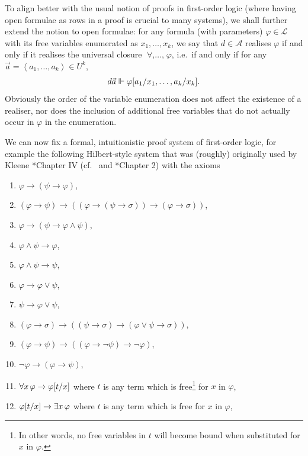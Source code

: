 \documentclass[12pt,openany]{book}
\theoremstyle{plain}
\theoremstyle{definition}
\newcommand\uplabel[1]{\textup{(#1)}}
\newcommand\tuple[1]{\left\langle #1 \right\rangle}
\newcommand\opA[1]{\mathop{\forall #1}}
\newcommand\opE[1]{\mathop{\exists #1}}
\begin{document}
To align better with the usual notion of proofs in first-order logic (where having open formulae as rows in a proof is crucial to many systems), we shall further extend the notion to open formulae: for any formula (with parameters) $\varphi \in \mathcal{L}$ with its free variables enumerated as $x_1, \ldots, x_k$, we say that $d \in \mathcal{A}$ realises $\varphi$ if and only if it realises the universal closure $\opA{x_1, \ldots, x_k} \varphi$, i.e.\ if and only if for any $\vec{a} = \tuple{a_1, \ldots, a_k} \in U^k$,
\[d \vec{a} \Vdash \varphi\mleft[a_1/x_1, \ldots, a_k/x_k\mright].\]
Obviously the order of the variable enumeration does not affect the existence of a realiser, nor does the inclusion of additional free variables that do not actually occur in $\varphi$ in the enumeration.

We can now fix a formal, intuitionistic proof system of first-order logic, for example the following Hilbert-style system that was (roughly) originally used by Kleene \cite{kleene52-metamathematics}*{Chapter IV} (cf.\ \cite{moschovakis-joan24-intuitionistic-logic} and \cite{troelstra-dalen88-constructivism-1}*{Chapter 2}) with the axioms
\begin{enumerate}[label=\uplabel{\arabic*}]
  \item $\varphi \rightarrow \left(\psi \rightarrow \varphi\right)$,
  \item $\left(\varphi \rightarrow \psi\right) \rightarrow \left(\left(\varphi \rightarrow \left(\psi \rightarrow \sigma\right)\right) \rightarrow \left(\varphi \rightarrow \sigma\right)\right)$,
  \item $\varphi \rightarrow \left(\psi \rightarrow \varphi \land \psi\right)$,
  \item $\varphi \land \psi \rightarrow \varphi$,
  \item $\varphi \land \psi \rightarrow \psi$,
  \item $\varphi \rightarrow \varphi \lor \psi$,
  \item $\psi \rightarrow \varphi \lor \psi$,
  \item \label{itm:int-logic-disj-elim} $\left(\varphi \rightarrow \sigma\right) \rightarrow \left(\left(\psi \rightarrow \sigma\right) \rightarrow \left(\varphi \lor \psi \rightarrow \sigma\right)\right)$,
  \item $\left(\varphi \rightarrow \psi\right) \rightarrow \left(\left(\varphi \rightarrow \neg \psi\right) \rightarrow \neg \varphi\right)$,
  \item $\neg \varphi \rightarrow \left(\varphi \rightarrow \psi\right)$,
  \item $\opA{x} \varphi \rightarrow \varphi\mleft[t/x\mright]$ where $t$ is any term which is free\footnote{In other words, no free variables in $t$ will become bound when substituted for $x$ in $\varphi$.} for $x$ in $\varphi$,
  \item $\varphi\mleft[t/x\mright] \rightarrow \opE{x} \varphi$ where $t$ is any term which is free for $x$ in $\varphi$,
\end{enumerate}
\end{document}
